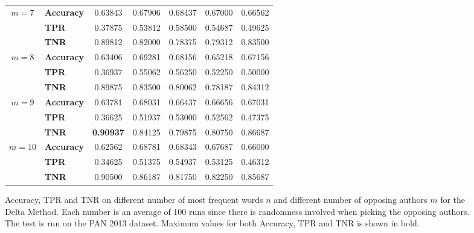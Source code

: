 \begin{figure}
\begin{tabular}{c|lccccc}
        \hline
        $m=7$  & \textbf{Accuracy} & 0.63843 & 0.67906 & 0.68437 & 0.67000 & 0.66562 \\
               & \textbf{TPR}      & 0.37875 & 0.53812 & 0.58500 & 0.54687 & 0.49625 \\
               & \textbf{TNR}      & 0.89812 & 0.82000 & 0.78375 & 0.79312 & 0.83500 \\
        \hline
        $m=8$  & \textbf{Accuracy} & 0.63406 & 0.69281 & 0.68156 & 0.65218 & 0.67156 \\
               & \textbf{TPR}      & 0.36937 & 0.55062 & 0.56250 & 0.52250 & 0.50000 \\
               & \textbf{TNR}      & 0.89875 & 0.83500 & 0.80062 & 0.78187 & 0.84312 \\
        \hline
        $m=9$  & \textbf{Accuracy} & 0.63781 & 0.68031 & 0.66437 & 0.66656 & 0.67031 \\
               & \textbf{TPR}      & 0.36625 & 0.51937 & 0.53000 & 0.52562 & 0.47375 \\
               & \textbf{TNR}      & \textbf{0.90937} & 0.84125 & 0.79875 & 0.80750 & 0.86687 \\
        \hline
        $m=10$ & \textbf{Accuracy} & 0.62562 & 0.68781 & 0.68343 & 0.67687 & 0.66000 \\
               & \textbf{TPR}      & 0.34625 & 0.51375 & 0.54937 & 0.53125 & 0.46312 \\
               & \textbf{TNR}      & 0.90500 & 0.86187 & 0.81750 & 0.82250 & 0.85687
    \end{tabular}
    \caption{Accuracy, \gls{TPR} and \gls{TNR} on different number of most
        frequent words $n$ and different number of opposing authors $m$ for the
        Delta Method. Each number is an average of 100 runs since there is
        randomness involved when picking the opposing authors. The test is run
        on the PAN 2013 dataset. Maximum values for both Accuracy, \gls{TPR} and
        \gls{TNR} is shown in bold.}
    \label{fig:delta_pan_2013_res}
\end{figure}

